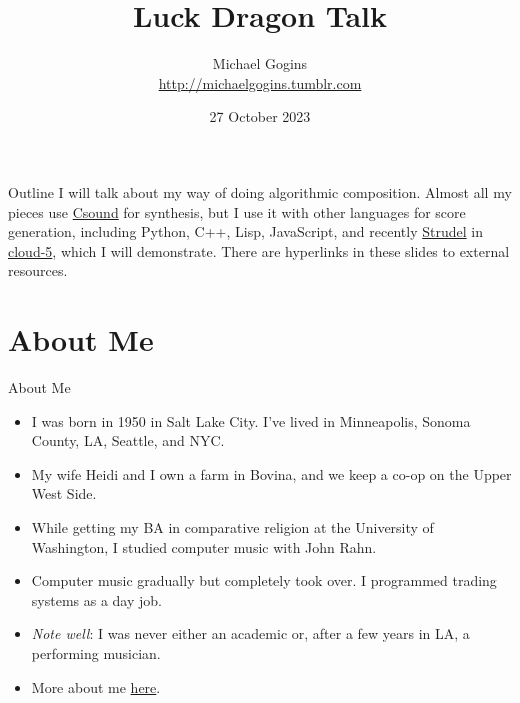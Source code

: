 \documentclass{beamer}
\title[Luck Dragon] %
{Luck Dragon Talk}
\author[Gogins] %
{Michael Gogins \\ \url{http://michaelgogins.tumblr.com} }
\institute[Irreducible Productions] %
{
  Irreducible Productions\\
  New York
}
\date[27 October 2023] %
{27 October 2023}
\begin{document}

\begin{frame}
  \titlepage
\end{frame}

\begin{frame}{Outline}
	I will talk about my way of doing algorithmic composition. Almost all my pieces use \href{http://csound.github.io}{Csound} for synthesis, but I use it with other languages for score generation, including Python, C++, Lisp, JavaScript, and recently \href{https://github.com/tidalcycles/strudel}{Strudel} in \href{https://gogins.github.io/cloud-5.html}{cloud-5}, which I will demonstrate. There are hyperlinks in these slides to external resources.
\tableofcontents
\end{frame}

\section{About Me}
\begin{frame}{About Me}

\begin{itemize}
\item I was born in 1950 in Salt Lake City. I've lived in Minneapolis, Sonoma County, LA, Seattle, and NYC.
\item My wife Heidi and I own a farm in Bovina, and we keep a co-op on the Upper West Side.
\item While getting my BA in comparative religion at the University of Washington, I studied computer music with John Rahn.
\item Computer music gradually but completely took over. I programmed trading systems as a day job.
\item \emph{Note well}: I was never either an academic or, after a few years in LA, a performing musician.
\item More about me \href{https://michaelgogins.tumblr.com}{here}.
\end{itemize}

\end{frame}
\end{document}
